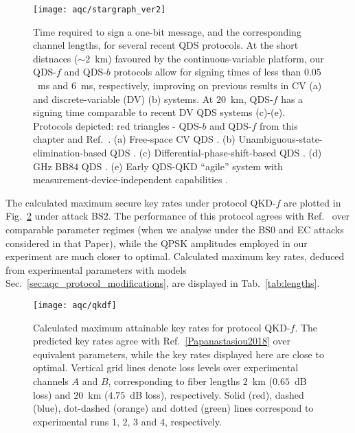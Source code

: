 \begin{figure}[htp]
\captionsetup{width=0.8\linewidth}
\centering
\texttt{[image: aqc/stargraph\_ver2]}
\caption{\label{fig:aqc_star} Time required to sign a one-bit message, and the corresponding channel lengths, for several recent QDS protocols. At the short distnaces ($\sim 2$~km) favoured by the continuous-variable platform, our QDS-$f$ and QDS-$b$ protocols allow for signing times of less than $0.05$~ms and $6$~ms, respectively, improving on previous results in CV (a) and discrete-variable (DV) (b) systems. At $20$~km, QDS-$f$ has a signing time comparable to recent DV QDS systems (c)-(e). Protocols depicted: red triangles - QDS-$b$ and QDS-$f$ from this chapter and Ref.~\cite{Richter2020}. (a) Free-space CV QDS \cite{Croal2016}. (b) Unambiguous-state-elimination-based QDS \cite{Donaldson2016}. (c) Differential-phase-shift-based QDS \cite{Collins2016}. (d) GHz BB$84$ QDS \cite{An2019}. (e) Early QDS-QKD ``agile'' system with measurement-device-independent capabilities \cite{Roberts2017}.}
\end{figure}


The calculated maximum secure key rates under protocol QKD-$f$ are plotted in Fig.~\ref{fig:aqc_qkdf} under attack BS$2$. The performance of this protocol agrees with Ref.~\cite{Papanastasiou2018} over comparable parameter regimes (when we analyse under the BS$0$ and EC attacks considered in that Paper), while the QPSK amplitudes employed in our experiment are much closer to optimal. Calculated maximum key rates, deduced from experimental parameters with models Sec.~\ref{sec:aqc_protocol_modifications}, are displayed in Tab.~\ref{tab:lengths}.

\begin{figure}[htp]
\centering
\texttt{[image: aqc/qkdf]}
\caption{\label{fig:aqc_qkdf} Calculated maximum attainable key rates for protocol QKD-$f$. The predicted key rates agree with Ref.~\ref{Papanastasiou2018} over equivalent parameters, while the key rates displayed here are close to optimal. Vertical grid lines denote loss levels over experimental channels $A$ and $B$, corresponding to fiber lengths $2$~km ($0.65$~dB loss) and $20$~km ($4.75$~dB loss), respectively. Solid (red), dashed (blue), dot-dashed (orange) and dotted (green) lines correspond to experimental runs $1$, $2$, $3$ and $4$, respectively.}
\end{figure}



\clearpage
